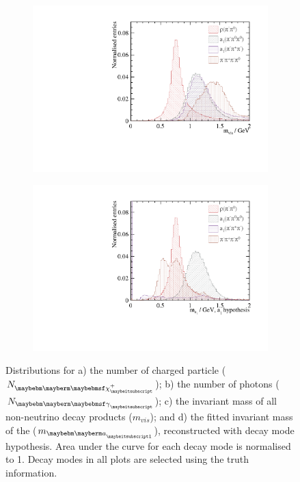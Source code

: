 \begin{figure}[htbp]
\begin{subfigure}[b]{0.45\textwidth}
 \includegraphics[width=\textwidth]{tau/var2/mVis_100GeV_improved_zoom.pdf}
  \caption{}
  \label{fig:tauVarMVis}
\end{subfigure}
\begin{subfigure}[b]{0.45\textwidth}
 \includegraphics[width=\textwidth]{tau/var2/mA1A1Fit_100GeV_improved_zoom.pdf}
  \caption{}
  \label{fig:tauVarMA1}
\end{subfigure}

\caption
{Distributions for a) the number of charged particle (${N}_{\charge}$); b) the number of photons (${N}_{\Pgg}$); c) the invariant mass of all non-neutrino decay products ($m_{vis}$); and d) the fitted invariant mass of the \Pai ($m_{\Pai}$), reconstructed with \decayAiPhotonShort decay mode hypothesis. Area under the curve for each decay mode is normalised to 1. Decay modes in all plots are selected using the truth information.}
\label{fig:tauVar}
\end{figure}


